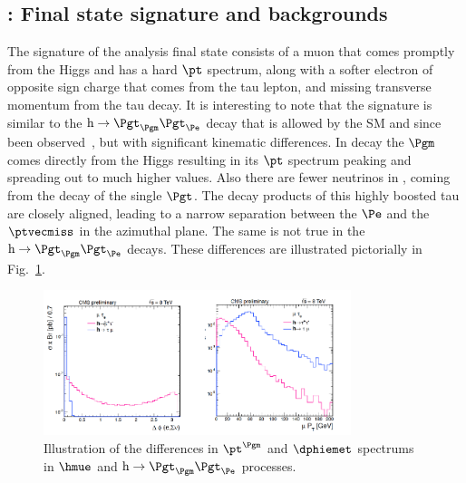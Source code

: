 \subsection{\hmue: Final state signature and backgrounds}
\label{h125_signature}
The signature of the \hmue analysis final state consists of a muon that comes promptly from the Higgs and has a hard $\pt$ spectrum, along with a softer electron of opposite sign charge that comes from the tau lepton, and missing transverse momentum from the tau decay. It is interesting to note that the signature is similar to the $\text{h} \to \Pgt_{\Pgm}\Pgt_{\Pe}$ decay that is allowed by the SM and since been observed~\cite{CMS-PAS-HIG-16-043}, but with significant kinematic differences. In \hmue decay the $\Pgm$ comes directly from the Higgs resulting in its $\pt$ spectrum peaking and spreading out to much higher values. Also there are fewer neutrinos in \hmue, coming from the decay of the single $\Pgt$. The decay products of this highly boosted tau are closely aligned, leading to a narrow separation between the $\Pe$ and the $\ptvecmiss$ in the azimuthal plane. The same is not true in the $\text{h} \to \Pgt_{\Pgm}\Pgt_{\Pe}$ decays. These differences are illustrated pictorially in Fig.~\ref{fig:htt_v_lfv}.






\begin{figure}
\begin{center}
\includegraphics[width=0.8\textwidth,keepaspectratio]{plots_and_figures/chapter5/htt_v_lfv.pdf}
\caption{Illustration of the differences in $\pt^{\Pgm}$ and $\dphiemet$ spectrums in $\hmue$ and $\text{h} \to \Pgt_{\Pgm}\Pgt_{\Pe}$ processes.}
\label{fig:htt_v_lfv}
\end{center}
\end{figure}

